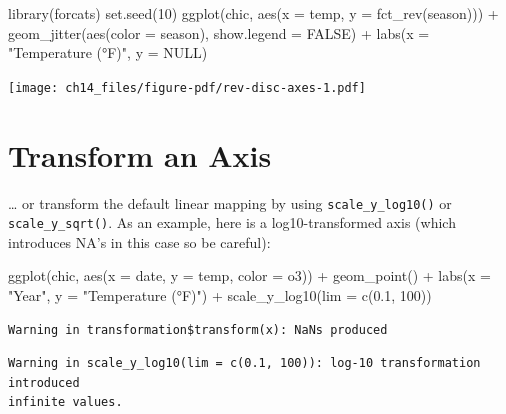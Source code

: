 \documentclass[
  letterpaper,
  DIV=11,
  numbers=noendperiod]{scrreprt}
\newenvironment{Shaded}{\begin{snugshade}}{\end{snugshade}}
\newcommand{\AttributeTok}[1]{\textcolor[rgb]{0.40,0.45,0.13}{#1}}
\newcommand{\ConstantTok}[1]{\textcolor[rgb]{0.56,0.35,0.01}{#1}}
\newcommand{\DecValTok}[1]{\textcolor[rgb]{0.68,0.00,0.00}{#1}}
\newcommand{\FloatTok}[1]{\textcolor[rgb]{0.68,0.00,0.00}{#1}}
\newcommand{\FunctionTok}[1]{\textcolor[rgb]{0.28,0.35,0.67}{#1}}
\newcommand{\NormalTok}[1]{\textcolor[rgb]{0.00,0.23,0.31}{#1}}
\newcommand{\SpecialCharTok}[1]{\textcolor[rgb]{0.37,0.37,0.37}{#1}}
\newcommand{\StringTok}[1]{\textcolor[rgb]{0.13,0.47,0.30}{#1}}
\begin{document}
\begin{Shaded}
\begin{Highlighting}[]
\FunctionTok{library}\NormalTok{(forcats)}
\FunctionTok{set.seed}\NormalTok{(}\DecValTok{10}\NormalTok{)}
\FunctionTok{ggplot}\NormalTok{(chic, }\FunctionTok{aes}\NormalTok{(}\AttributeTok{x =}\NormalTok{ temp, }\AttributeTok{y =} \FunctionTok{fct\_rev}\NormalTok{(season))) }\SpecialCharTok{+}
  \FunctionTok{geom\_jitter}\NormalTok{(}\FunctionTok{aes}\NormalTok{(}\AttributeTok{color =}\NormalTok{ season), }\AttributeTok{show.legend =} \ConstantTok{FALSE}\NormalTok{) }\SpecialCharTok{+}
  \FunctionTok{labs}\NormalTok{(}\AttributeTok{x =} \StringTok{"Temperature (°F)"}\NormalTok{, }\AttributeTok{y =} \ConstantTok{NULL}\NormalTok{)}
\end{Highlighting}
\end{Shaded}

\texttt{[image: ch14\_files/figure-pdf/rev-disc-axes-1.pdf]}

\section{Transform an Axis}\label{transform-an-axis}

\ldots{} or transform the default linear mapping by using
\texttt{scale\_y\_log10()} or \texttt{scale\_y\_sqrt()}. As an example,
here is a log10-transformed axis (which introduces NA's in this case so
be careful):

\begin{Shaded}
\begin{Highlighting}[]
\FunctionTok{ggplot}\NormalTok{(chic, }\FunctionTok{aes}\NormalTok{(}\AttributeTok{x =}\NormalTok{ date, }\AttributeTok{y =}\NormalTok{ temp, }\AttributeTok{color =}\NormalTok{ o3)) }\SpecialCharTok{+}
  \FunctionTok{geom\_point}\NormalTok{() }\SpecialCharTok{+}
  \FunctionTok{labs}\NormalTok{(}\AttributeTok{x =} \StringTok{"Year"}\NormalTok{, }\AttributeTok{y =} \StringTok{"Temperature (°F)"}\NormalTok{) }\SpecialCharTok{+}
  \FunctionTok{scale\_y\_log10}\NormalTok{(}\AttributeTok{lim =} \FunctionTok{c}\NormalTok{(}\FloatTok{0.1}\NormalTok{, }\DecValTok{100}\NormalTok{))}
\end{Highlighting}
\end{Shaded}

\begin{verbatim}
Warning in transformation$transform(x): NaNs produced
\end{verbatim}

\begin{verbatim}
Warning in scale_y_log10(lim = c(0.1, 100)): log-10 transformation introduced
infinite values.
\end{verbatim}
\end{document}

